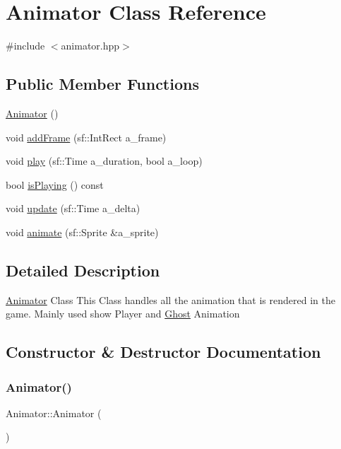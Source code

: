 \hypertarget{class_animator}{}\section{Animator Class Reference}
\label{class_animator}


{\ttfamily \#include $<$animator.\+hpp$>$}

\subsection*{Public Member Functions}
\begin{DoxyCompactItemize}
\item 
\hyperlink{class_animator_a701eeb9283612be2027425efb06bbff7}{Animator} ()
\item 
void \hyperlink{class_animator_a69e57eedcfb49c3b6d7802ff906486b7}{add\+Frame} (sf\+::\+Int\+Rect a\+\_\+frame)
\item 
void \hyperlink{class_animator_a8220e9ec75ce8e3425e8ca44c309f700}{play} (sf\+::\+Time a\+\_\+duration, bool a\+\_\+loop)
\item 
bool \hyperlink{class_animator_af652cfa1671a9a8155f85b2b33f65a17}{is\+Playing} () const
\item 
void \hyperlink{class_animator_a79c476575fc1e1c50e8f119be6806cf0}{update} (sf\+::\+Time a\+\_\+delta)
\item 
void \hyperlink{class_animator_acb1e3abc21b1ea2133baa4bd089062a0}{animate} (sf\+::\+Sprite \&a\+\_\+sprite)
\end{DoxyCompactItemize}


\subsection{Detailed Description}
\hyperlink{class_animator}{Animator} Class This Class handles all the animation that is rendered in the game. Mainly used show Player and \hyperlink{class_ghost}{Ghost} Animation 

\subsection{Constructor \& Destructor Documentation}
\mbox{\label{class_animator_a701eeb9283612be2027425efb06bbff7}} 
\subsubsection{\texorpdfstring{Animator()}{Animator()}}
{\footnotesize\ttfamily Animator\+::\+Animator (\begin{DoxyParamCaption}{ }\end{DoxyParamCaption})}

